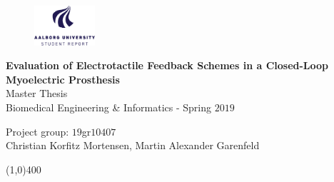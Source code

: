 \clearpage
\thispagestyle{empty}

\begin{figure}[H]
	\raggedleft
	\includegraphics[width=0.2\textwidth]{figures/aaulogo-en.png}
\end{figure} 

\vspace{5 cm}

\begin{center}
	\begin{Huge}
		\textbf{Evaluation of Electrotactile Feedback Schemes in a
			Closed-Loop Myoelectric Prosthesis}\\
		\vspace{5 mm}
		Master Thesis \\
		Biomedical Engineering \& Informatics - Spring $2019$\\
		\vspace{3 mm}
	\end{Huge}
	{\Large Project group: $19$gr$10407$} \\
	\vspace{1cm}
	\large{Christian Korfitz Mortensen, Martin Alexander Garenfeld}
\end{center}
\vspace*{\fill}

\begin{center}
	\line(1,0){400}
\end{center}

%
%
%
%
%	
%	
%	
%
%
%
\newpage
